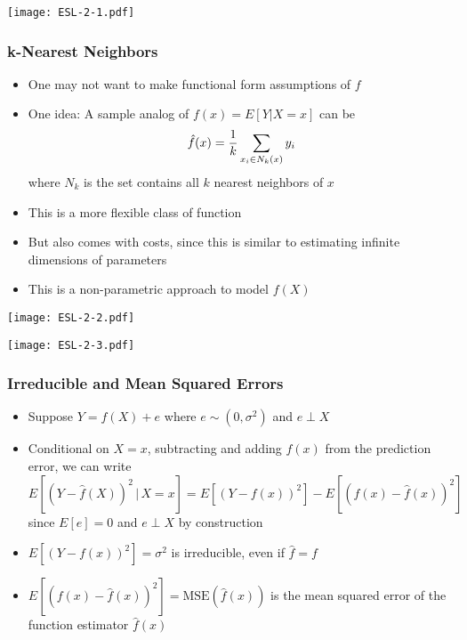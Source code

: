 \documentclass[12pt, xcolor = dvipsnames]{beamer}
\begin{document}
\begin{frame}
\begin{center}
  \texttt{[image: ESL-2-1.pdf]}
\end{center}
\end{frame}


\begin{frame}
\frametitle{k-Nearest Neighbors}
\begin{itemize}
  \item One may not want to make functional form assumptions of $f$
  \item One idea: A sample analog of $f(x)=E[Y|X=x]$ can be
  \[\hat{f}(x)={1\over k}\sum_{x_i\in N_k(x)}y_i\]
  where $N_k$ is the set contains all $k$ nearest neighbors of $x$
  \item This is a more flexible class of function
  \item But also comes with costs, since this is similar to estimating infinite dimensions of parameters
  \item This is a non-parametric approach to model $f(X)$
\end{itemize}
\end{frame}


\begin{frame}
\begin{center}
  \texttt{[image: ESL-2-2.pdf]}
\end{center}
\end{frame}


\begin{frame}
\begin{center}
  \texttt{[image: ESL-2-3.pdf]}
\end{center}
\end{frame}


\begin{frame}
\frametitle{Irreducible and Mean Squared Errors}
\begin{itemize}
  \item Suppose $Y=f(X)+e$ where $e\sim(0,\sigma^2)$ and $e \perp X$
  \item Conditional on $X=x$, subtracting and adding $f(x)$ from the prediction error, we can write
  \[E[(Y-\hat{f}(X))^2\,|\,X=x]=E[(Y-f(x))^2]-E[(f(x)-\hat{f}(x))^2]\]
  since $E[e]=0$ and $e \perp X$ by construction
  \item $E[(Y-f(x))^2]=\sigma^2$ is irreducible, even if $\hat{f}=f$
  \item $E[(f(x)-\hat{f}(x))^2]=\mbox{MSE}(\hat{f}(x))$ is the mean squared error of the function estimator $\hat{f}(x)$
\end{itemize}
\end{frame}
\end{document}
